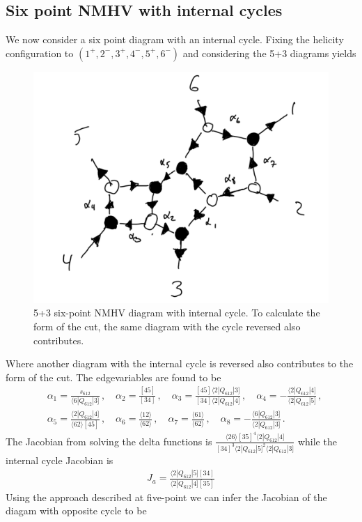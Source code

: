 \documentclass[letter,11pt]{article}
\newcommand{\ab}[1]{\langle #1 \rangle}
\newcommand{\sqb}[1]{[ #1 ]}
\newcommand{\aMs}[3]{\langle #1|#2|#3]}  		%
\newcommand{\sab}[1]{s_{#1}}
\begin{document}
\subsection{Six point NMHV with internal cycles}
We now consider a six point diagram with an internal cycle. Fixing the helicity configuration to $(1^+,2^-,3^+,4^-,5^+,6^-)$ and considering the 5+3 diagrams yields 
\begin{figure}[H]
	\centering
	\includegraphics[width=0.45\linewidth]{3+5L}
	\caption{5+3 six-point NMHV diagram with internal cycle. To calculate the form of the cut, the same diagram with the cycle reversed also contributes.}
	\label{fig:5pt3l}
\end{figure}
Where another diagram with the internal cycle is reversed also contributes to the form of the cut. The edgevariables are found to be
\begin{equation}
	\begin{aligned}
		& \alpha_1 = \frac{\sab{612}}{\aMs{6}{Q_{612}}{3}}\,, \quad \alpha_2 = \frac{[45]}{[34]}\,, \quad \alpha_3 = \frac{[45]\aMs{2}{Q_{612}}{3}}{[34]\aMs{2}{Q_{612}}{4}}\,, \quad \alpha_4 = -\frac{\aMs{2}{Q_{612}}{4}}{\aMs{2}{Q_{612}}{5}}\,,\\ 
		&\alpha_5 = \frac{\aMs{2}{Q_{612}}{4}}{\ab{62}[45]}\,, 
		\quad
		\alpha_6 = \frac{\ab{12}}{\ab{62}}\,,\quad \alpha_7 = \frac{\ab{61}}{\ab{62}}\,,\quad
		\alpha_8 = - \frac{\aMs{6}{Q_{612}}{3}}{\aMs{2}{Q_{612}}{3}}\,.
	\end{aligned}
\end{equation}
The Jacobian from solving the delta functions is $ \frac{\ab{26}\sqb{35}^4\aMs{2}{Q_{612}}{4}}{\sqb{34}^3\aMs{2}{Q_{612}}{5}^2\aMs{2}{Q_{612}}{3}}$ while the internal cycle Jacobian is
\begin{equation}
	\begin{aligned}
		J_a=\frac{\aMs{2}{Q_{612}}{5}\sqb{34}}{\aMs{2}{Q_{612}}{4}\sqb{35}}
	\end{aligned}
\end{equation}
Using the approach described at five-point we can infer the Jacobian of the diagam with opposite cycle to be
\end{document}
